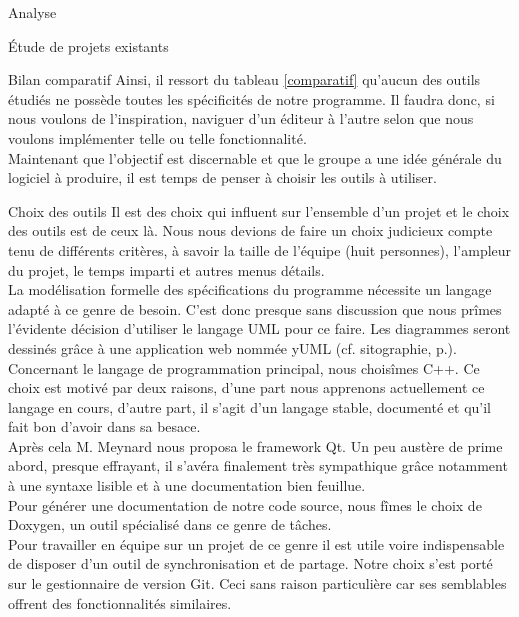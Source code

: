 \documentclass[a4paper, 12pt]{report}
\begin{document}
\begin{part}{Analyse}
\begin{chapter}{Étude de projets existants}
\begin{section}{Bilan comparatif}
				Ainsi, il ressort du tableau \ref{comparatif} qu'aucun des outils étudiés ne possède toutes les spécificités de notre programme.
				Il faudra donc, si nous voulons de l'inspiration, naviguer d'un éditeur à l'autre selon que nous voulons implémenter telle ou
				telle fonctionnalité.\\


				Maintenant que l'objectif est discernable et que le groupe a une idée générale du logiciel à produire, il est temps de
				penser à choisir les outils à utiliser.
			\end{section}
		\end{chapter}
		\begin{chapter}{Choix des outils}
			Il est des choix qui influent sur l'ensemble d'un projet et le choix des outils est de ceux là.
			Nous nous devions de faire un choix judicieux compte tenu de différents critères, à savoir la taille de l'équipe (huit personnes),
			l'ampleur du projet, le temps imparti et autres menus détails.\\


			La modélisation formelle des spécifications du programme nécessite un langage adapté à ce genre de besoin. C'est donc presque
			sans discussion que nous prîmes l'évidente décision d'utiliser le langage UML pour ce faire.
			Les diagrammes seront dessinés grâce à une application web nommée yUML (cf. sitographie, p.\pageref{sitographie}).\\


			Concernant le langage de programmation principal, nous choisîmes \gls{C++}.
			Ce choix est motivé par deux raisons, d'une part nous apprenons actuellement ce langage en cours, d'autre part,
			il s'agit d'un langage stable, documenté et qu'il fait bon d'avoir dans sa besace.\\


			Après cela M. Meynard nous proposa le framework \gls{Qt}. Un peu austère de prime abord, presque effrayant, il s'avéra finalement très
			sympathique grâce notamment à une syntaxe lisible et à une documentation bien feuillue.\\

			Pour générer une documentation de notre code source, nous fîmes le choix de \gls{Doxygen}, un outil spécialisé dans ce genre
			de tâches.\\


			Pour travailler en équipe sur un projet de ce genre il est utile voire indispensable de disposer d'un outil de synchronisation et
			de partage. Notre choix s'est porté sur le gestionnaire de version \gls{Git}. Ceci sans raison particulière car ses semblables offrent
			des fonctionnalités similaires.\\



\end{chapter}
\end{part}
\end{document}
